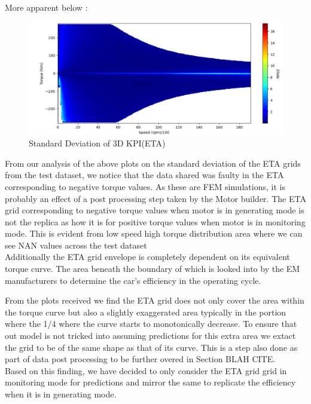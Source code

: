 \documentclass{report} %
\begin{document}
More apparent below :

\begin{figure}[H]
    \centering
    \includegraphics[width=1\textwidth]{./ReportImages/colorful_stddev_y2.png} 
    \caption{Standard Deviation of 3D KPI(ETA)} 
    \label{fig:Standard Deviation of 3D KPI(ETA)}
\end{figure}

From our analysis of the above plots on the standard deviation of the ETA grids from the test dataset, we notice that the data shared was faulty in the ETA corresponding to negative torque values.
As these are FEM simulations, it is probably an effect of a post processing step taken by the Motor builder.
The ETA grid corresponding to negative torque values when motor is in generating mode is not the replica as how it is for positive torque values when motor is in monitoring mode. 
This is evident from low speed high torque distribution area where we can see NAN values across the test dataset\\

Additionally the ETA grid envelope is completely dependent on its equivalent torque curve. The area beneath the boundary of which is looked into by the \ac{EM} manufacturers to determine the car's efficiency in the operating cycle.

From the plots received we find the ETA grid does not only cover the area within the torque curve but also a slightly exaggerated area typically in the portion where the 1/4 where the curve starts to monotonically decrease.
To ensure that out model is not tricked into assuming predictions for this extra area we extact the grid to be of the same shape as that of its curve.
This is a step also done as part of data post processing to be further overed in Section BLAH CITE. \\

Based on this finding, we have decided to only consider the ETA grid grid in monitoring mode for predictions and mirror the same to replicate the efficiency when it is in generating mode.\\
\end{document}

